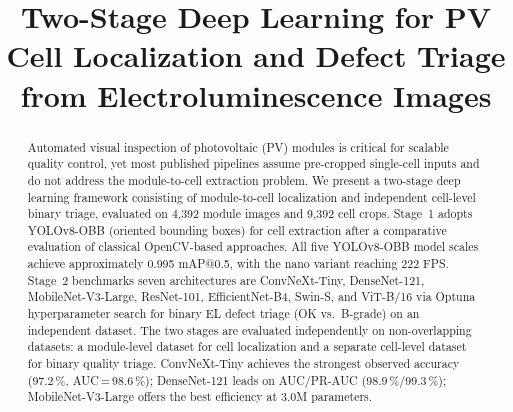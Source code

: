 \documentclass[conference]{IEEEtran}
\begin{document}
\title{Two-Stage Deep Learning for PV Cell Localization and Defect Triage from Electroluminescence Images%
}


\maketitle

\begin{abstract}
Automated visual inspection of photovoltaic (PV) modules is critical for scalable quality control, yet most published pipelines assume pre-cropped single-cell inputs and do not address the module-to-cell extraction problem. We present a two-stage deep learning framework consisting of module-to-cell localization and independent cell-level binary triage, evaluated on 4{,}392 module images and 9{,}392 cell crops. Stage~1 adopts YOLOv8-OBB (oriented bounding boxes) for cell extraction after a comparative evaluation of classical OpenCV-based approaches. All five YOLOv8-OBB model scales achieve approximately 0.995 mAP@0.5, with the nano variant reaching 222 FPS. Stage~2 benchmarks seven architectures are ConvNeXt-Tiny, DenseNet-121, MobileNet-V3-Large, ResNet-101, EfficientNet-B4, Swin-S, and ViT-B/16 via Optuna hyperparameter search for binary EL defect triage (OK vs.\ B-grade) on an independent dataset. The two stages are evaluated independently on non-overlapping datasets: a module-level dataset for cell localization and a separate cell-level dataset for binary quality triage. ConvNeXt-Tiny achieves the strongest observed accuracy (97.2\,\%, AUC\,=\,98.6\,\%); DenseNet-121 leads on AUC/PR-AUC (98.9\,\%/99.3\,\%); MobileNet-V3-Large offers the best efficiency at 3.0M parameters.
\end{abstract}
\end{document}
